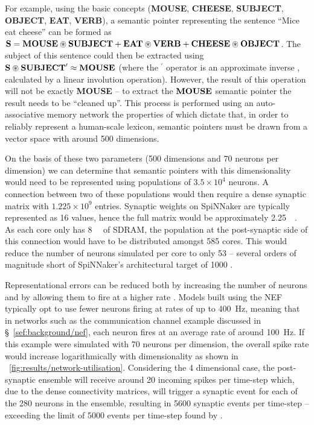 \documentclass[conference]{IEEEtran}
\newcommand{\semanticpointer}{\textbf}
\newcommand{\msemanticpointer}[1]{\mbox{\semanticpointer{#1}}}
\begin{document}
For example, using the basic concepts (\semanticpointer{MOUSE}, \semanticpointer{CHEESE}, \semanticpointer{SUBJECT}, \semanticpointer{OBJECT}, \semanticpointer{EAT}, \semanticpointer{VERB}), a semantic pointer representing the sentence ``Mice eat cheese'' can be formed as $\msemanticpointer{S} = \msemanticpointer{MOUSE} \circledast \msemanticpointer{SUBJECT} + \msemanticpointer{EAT} \circledast \msemanticpointer{VERB} + \msemanticpointer{CHEESE} \circledast \msemanticpointer{OBJECT}$.
The subject of this sentence could then be extracted using $\msemanticpointer{S} \circledast \msemanticpointer{SUBJECT}^\prime \approx \msemanticpointer{MOUSE}$ (where the ${}^\prime$ operator is an approximate inverse \parencite[\S D.2]{eliasmith2013build}, calculated by a linear involution operation).
However, the result of this operation will not  be exactly \semanticpointer{MOUSE} -- to extract the $\msemanticpointer{MOUSE}$ semantic pointer the result needs to be ``cleaned up''.
This process is performed using an auto-associative memory network \parencite{Stewart2011} the properties of which dictate that, in order to reliably represent a human-scale lexicon, semantic pointers must be drawn from a vector space with around 500 dimensions.

On the basis of these two parameters (500 dimensions and 70 neurons per dimension) we can determine that semantic pointers with this dimensionality would need to be represented using populations of $3.5\times10^4$ neurons.
A connection between two of these populations would then require a dense synaptic matrix with $1.225\times10^9$ entries.
Synaptic weights on SpiNNaker are typically represented as \SI{16}{\bit} values, hence the full matrix would be approximately \SI{2.25}{\gibi\byte}.
As each core only has \SI{8}{\mebi\byte} of SDRAM, the population at the post-synaptic side of this connection would have to be distributed amongst 585 cores.
This would reduce the number of neurons simulated per core to only 53 -- several orders of magnitude short of SpiNNaker's architectural target of 1000 \parencite{}. 

Representational errors can be reduced both by increasing the number of neurons and by allowing them to fire at a higher rate \parencite{Eliasmith2004}.
Models built using the NEF typically opt to use fewer neurons firing at rates of up to \SI{400}{\hertz}, meaning that in networks such as the communication channel example discussed in \S~\ref{sef:background/nef}, each neuron fires at an average rate of around \SI{100}{\hertz}.
If this example were simulated with 70 neurons per dimension, the overall spike rate would increase logarithmically with dimensionality as shown in \figurename~\ref{fig:results/network-utilisation}.
Considering the 4 dimensional case, the post-synaptic ensemble will receive around 20 incoming spikes per time-step which, due to the dense connectivity matrices, will trigger a synaptic event for each of the 280 neurons in the ensemble, resulting in 5600 synaptic events per time-step -- exceeding the limit of 5000 events per time-step found by \textcite{Sharp2013}.
\end{document}
